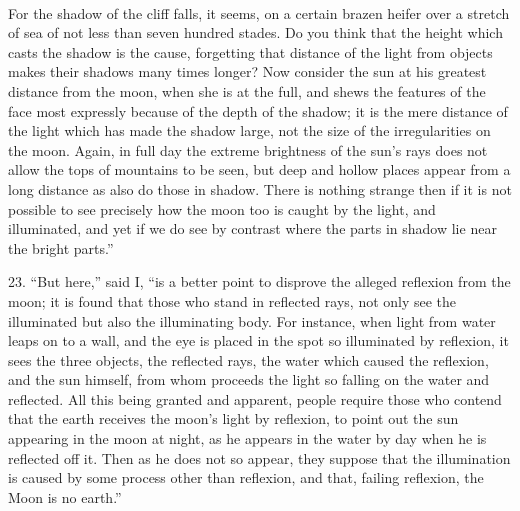 \documentclass[a4paper, 11pt, oneside, polutonikogreek, english]{article}
\begin{document}
\paragraph{}
For the shadow of the cliff falls, it seems, on a certain brazen heifer over a stretch of sea of not less than seven hundred stades. Do you think that the height which casts the shadow is the cause, forgetting that distance of the light from objects makes their shadows many times longer? Now consider the sun at his greatest distance from the moon, when she is at the full, and shews the features of the face most expressly because of the depth of the shadow; it is the mere distance of the light which has made the shadow large, not the size of the irregularities on the moon. Again, in full day the extreme brightness of the sun's rays does not allow the tops of mountains to be seen, but deep and hollow places appear from a long distance as also do those in shadow. There is nothing strange then if it is not possible to see precisely how the moon too is caught by the light, and illuminated, and yet if we do see by contrast where the parts in shadow lie near the bright parts.''

23. ``But here,'' said I, ``is a better point to disprove the alleged reflexion from the moon; it is found that those who stand in reflected rays, not only see the illuminated but also the illuminating body. For instance, when light from water leaps on to a wall, and the eye is placed in the spot so illuminated by reflexion, it sees the three objects, the reflected rays, the water which caused the reflexion, and the sun himself, from whom proceeds the light so falling on the water and reflected. All this being granted and apparent, people require those who contend that the earth receives the moon's light by reflexion, to point out the sun appearing in the moon at night, as he appears in the water by day when he is reflected off it. Then as he does not so appear, they suppose that the illumination is caused by some process other than reflexion, and that, failing reflexion, the Moon is no earth.''
\end{document}
